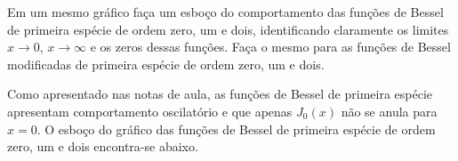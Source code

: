 \documentclass[a4paper,12pt, leqno, answers]{exam}
\begin{document}
\begin{questions}

    \question[P2 de 2006, P2 de 2012] Em um mesmo gr\'{a}fico fa\c{c}a um esbo\c{c}o do comportamento das fun\c{c}\~{o}es de Bessel de primeira esp\'{e}cie de ordem zero, um e dois, identificando claramente os limites $x \to 0$, $x \to \infty$ e os zeros dessas fun\c{c}\~{o}es. Fa\c{c}a o mesmo para as fun\c{c}\~{o}es de Bessel modificadas de primeira esp\'{e}cie de ordem zero, um e dois.
    \begin{solution}
        Como apresentado nas notas de aula, as fun\c{c}\~{o}es de Bessel de primeira esp\'{e}cie apresentam comportamento oscilat\'{o}rio e que apenas $J_0(x)$ n\~{a}o se anula para $x = 0$. O esbo\c{c}o do gr\'{a}fico das fun\c{c}\~{o}es de Bessel de primeira esp\'{e}cie de ordem zero, um e dois encontra-se abaixo.
        \begin{center}
\end{center}
\end{solution}
\end{questions}
\end{document}
